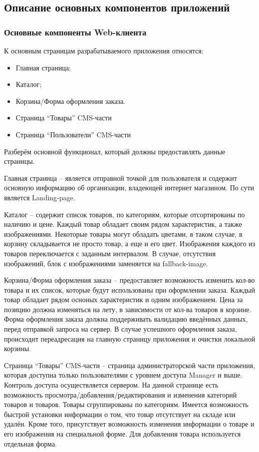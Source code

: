 \subsection{Описание основных компонентов приложений}\label{subsec:2-common-components}\indent


\subsubsection{Основные компоненты Web-клиента}

К основным страницам разрабатываемого приложения относятся:

\begin{itemize}
    \item Главная страница;
    \item Каталог;
    \item Корзина/Форма оформления заказа.
    \item Страница “Товары” CMS-части
    \item Страница “Пользователи” CMS-части
\end{itemize}

Разберём основной функционал, который должны предоставлять данные страницы.

Главная страница – является отправной точкой для пользователя и содержит основную информацию об организации, владеющей интернет магазином.
По сути является Landing-page.

Каталог – содержит список товаров, по категориям, которые отсортированы по наличию и цене.
Каждый товар обладает своим рядом характеристик, а также изображениями.
Некоторые товары могут обладать цветами, в таком случае, в корзину складывается не просто товар, а еще и его цвет.
Изображения каждого из товаров переключается с заданным интервалом.
В случае, отсутствия изображений, блок с изображениями заменяется на fallback-image.

Корзина/Форма оформления заказа – предоставляет возможность изменить кол-во товара и их список, которые будут использованы при оформлении заказа.
Каждый товар обладает рядом осноных характеристик и одним изображением.
Цена за позицию должна изменяться на лету, в зависимости от кол-ва товаров в корзине.
Форма оформления заказа должна поддерживать валидацию введённых данных, перед отправкой запроса на сервер.
В случае успешного оформления заказа, происходит переадресация на главную страницу приложения и очистки локальной корзины.

Страница “Товары” CMS-части – страница администраторской части приложения, которая доступна только пользователями с уровнем доступа Manager и выше.
Контроль доступа осуществляется сервером.
На данной странице есть возможность просмотра/добавления/редактирования и изменения категорий товаров и товаров.
Товары сгруппированы по категориям.
Имеется возможность быстрой установки информации о том, что товар отсутствует на складе или удалён.
Кроме того, присутствует возможность изменения информации о товаре и его изображения на специальной форме.
Для добавления товара используется отдельная форма.

